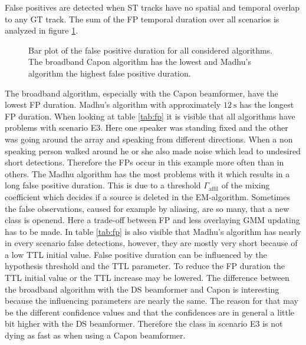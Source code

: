 False positives are detected when \ac{ST} tracks have no spatial and temporal overlap to any \ac{GT} track. The sum of the FP temporal duration over all scenarios is analyzed in figure \ref{fig:results_fp}.
\begin{figure}[!ht]
	\centering
		\def\svgwidth{0.6\linewidth}
		  \small
		\caption{Bar plot of the false positive duration for all considered algorithms. The broadband Capon algorithm has the lowest and Madhu's algorithm the highest false positive duration.}
		\label{fig:results_fp}
\end{figure}
The broadband algorithm, especially with the Capon beamformer, have the lowest FP duration. Madhu's algorithm with approximately $\SI{12}{\s}$ has the longest FP duration. When looking at table \ref{tab:fp} it is visible that all algorithms have problems with scenario E3. Here one speaker was standing fixed and the other was going around the array and speaking from different directions. When a non speaking person walked around he or she also made noise which lead to undesired short detections. Therefore the FPs occur in this example more often than in others. The Madhu algorithm has the most problems with it which results in a long false positive duration. This is due to a threshold $\Gamma_\text{affil}$ of the mixing coefficient which decides if a source is deleted in the EM-algorithm. Sometimes the false observations, caused for example by aliasing, are so many, that a new class is openend. Here a trade-off between FP and less overlaying \ac{GMM} updating has to be made. In table \ref{tab:fp} is also visible that Madhu's algorithm has nearly in every scenario false detections, however, they are mostly very short because of a low TTL initial value.
False positive duration can be influenced by the hypothesis threshold and the TTL parameter. To reduce the FP duration the TTL initial value or the TTL increase may be lowered. The difference between the broadband algorithm with the \ac{DS} beamformer and Capon is interesting because the influencing parameters are nearly the same. The reason for that may be the different confidence values and that the confidences are in general a little bit higher with the \ac{DS} beamformer. Therefore the class in scenario E3 is not dying as fast as when using a Capon beamformer.

